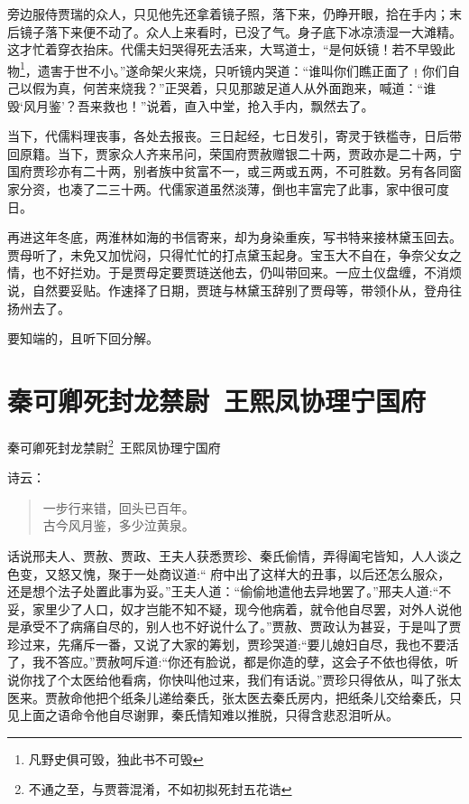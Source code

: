 \documentclass[12pt,oneside]{book}
\newenvironment{shici}{%
\begin{verse}%
\centering\large\hspace{12pt}}%
{\end{verse}}
\begin{document}
旁边服侍贾瑞的众人，只见他先还拿着镜子照，落下来，仍睁开眼，拾在手内；末后镜子落下来便不动了。众人上来看时，已没了气。身子底下冰凉渍湿一大滩精。这才忙着穿衣抬床。代儒夫妇哭得死去活来，大骂道士，“是何妖镜！若不早毁此物\footnote{凡野史俱可毁，独此书不可毁}，遗害于世不小。”遂命架火来烧，只听镜内哭道：“谁叫你们瞧正面了﹗你们自己以假为真，何苦来烧我？”正哭着，只见那跛足道人从外面跑来，喊道：“谁毁‘风月鉴’？吾来救也！”说着，直入中堂，抢入手内，飘然去了。

当下，代儒料理丧事，各处去报丧。三日起经，七日发引，寄灵于铁槛寺，日后带回原籍。当下，贾家众人齐来吊问，荣国府贾赦赠银二十两，贾政亦是二十两，宁国府贾珍亦有二十两，别者族中贫富不一，或三两或五两，不可胜数。另有各同窗家分资，也凑了二三十两。代儒家道虽然淡薄，倒也丰富完了此事，家中很可度日。

再进这年冬底，两淮林如海的书信寄来，却为身染重疾，写书特来接林黛玉回去。贾母听了，未免又加忧闷，只得忙忙的打点黛玉起身。宝玉大不自在，争奈父女之情，也不好拦劝。于是贾母定要贾琏送他去，仍叫带回来。一应土仪盘缠，不消烦说，自然要妥贴。作速择了日期，贾琏与林黛玉辞别了贾母等，带领仆从，登舟往扬州去了。

要知端的，且听下回分解。





 
\chapter{秦可卿死封龙禁尉~王熙凤协理宁国府}
秦可卿死封龙禁尉\footnote{不通之至，与贾蓉混淆，不如初拟死封五花诰}~王熙凤协理宁国府

诗云：

\begin{shici}
一步行来错，回头已百年。\\
古今风月鉴，多少泣黄泉。
\end{shici}


话说邢夫人、贾赦、贾政、王夫人获悉贾珍、秦氏偷情，弄得阖宅皆知，人人谈之色变，又怒又愧，聚于一处商议道:“ 府中出了这样大的丑事，以后还怎么服众，还是想个法子处置此事为妥。”王夫人道：“偷偷地遣他去异地罢了。”邢夫人道:“不妥，家里少了人口，奴才岂能不知不疑，现今他病着，就令他自尽罢，对外人说他是承受不了病痛自尽的，别人也不好说什么了。”贾赦、贾政认为甚妥，于是叫了贾珍过来，先痛斥一番，又说了大家的筹划，贾珍哭道:“要儿媳妇自尽，我也不要活了，我不答应。”贾赦呵斥道:“你还有脸说，都是你造的孽，这会子不依也得依，听说你找了个太医给他看病，你快叫他过来，我们有话说。”贾珍只得依从，叫了张太医来。贾赦命他把个纸条儿递给秦氏，张太医去秦氏房内，把纸条儿交给秦氏，只见上面之语命令他自尽谢罪，秦氏情知难以推脱，只得含悲忍泪听从。
\end{document}
